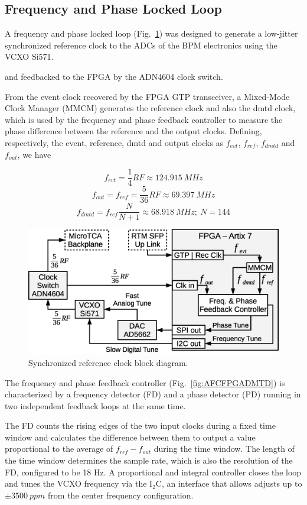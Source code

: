 \documentclass[a4paper,
               biblatex,      %
               ]{jacow}
\begin{document}
\subsection{Frequency and Phase Locked Loop}
 A frequency and phase locked loop (Fig.~\ref{fig:AFCRefClockLoop}) was designed to generate a low-jitter synchronized reference clock to the ADCs of the BPM electronics using the VCXO Si571.
 
 and feedbacked to the FPGA by the ADN4604 clock switch.

From the event clock recovered by the FPGA GTP transceiver, a Mixed-Mode Clock Manager (MMCM) generates the reference clock and also the dmtd clock, which is used by the frequency and phase feedback controller to measure the phase difference between the reference and the output clocks. Defining, respectively, the event, reference, dmtd and output clocks as $f_{evt}$, $f_{ref}$, $f_{dmtd}$ and $f_{out}$, we have

\[f_{evt} = \frac{1}{4}RF \approx 124.915~MHz\]
\[f_{out} = f_{ref} = \frac{5}{36}RF \approx 69.397~MHz\]
\[f_{dmtd} = f_{ref}\frac{N}{N+1} \approx 68.918~MHz;~N=144\]

\begin{figure}[!htb]
   \centering
   \includegraphics*[width=0.9\columnwidth]{AFCRefClockLoop}
   \caption{Synchronized reference clock block diagram.}
   \label{fig:AFCRefClockLoop}
\end{figure}

The frequency and phase feedback controller (Fig.~\ref{fig:AFCFPGADMTD}) is characterized by a frequency detector (FD) and a phase detector (PD) running in two independent feedback loops at the same time.

The FD counts the rising edges of the two input clocks during a fixed time window and calculates the difference between them to output a value proportional to the average of $f_{ref}-f_{out}$ during the time window. The length of the time window determines the sample rate, which is also the resolution of the FD, configured to be 18 Hz. A proportional and integral controller closes the loop and tunes the VCXO frequency via the I$_{2}$C, an interface that allows adjusts up to $\pm3500~ppm$ from the center frequency configuration. 
\end{document}
